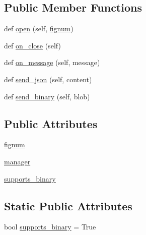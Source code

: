 \subsection*{Public Member Functions}
\begin{DoxyCompactItemize}
\item 
def \hyperlink{classmatplotlib_1_1backends_1_1backend__webagg_1_1WebAggApplication_1_1WebSocket_a1dfdc349a1da9bb45b24d4277d94e038}{open} (self, \hyperlink{classmatplotlib_1_1backends_1_1backend__webagg_1_1WebAggApplication_1_1WebSocket_a50abcf7b7843baae4b50170672a37886}{fignum})
\item 
def \hyperlink{classmatplotlib_1_1backends_1_1backend__webagg_1_1WebAggApplication_1_1WebSocket_aba3f0644181bbbdf2933b309eb1dd271}{on\+\_\+close} (self)
\item 
def \hyperlink{classmatplotlib_1_1backends_1_1backend__webagg_1_1WebAggApplication_1_1WebSocket_ab9a8cc1c5033e531ac3b9ab7cff82c19}{on\+\_\+message} (self, message)
\item 
def \hyperlink{classmatplotlib_1_1backends_1_1backend__webagg_1_1WebAggApplication_1_1WebSocket_ab5d2a19217336ecbdd695b0b681cd395}{send\+\_\+json} (self, content)
\item 
def \hyperlink{classmatplotlib_1_1backends_1_1backend__webagg_1_1WebAggApplication_1_1WebSocket_ace72d425cee9da5be3d4bb9530726caf}{send\+\_\+binary} (self, blob)
\end{DoxyCompactItemize}
\subsection*{Public Attributes}
\begin{DoxyCompactItemize}
\item 
\hyperlink{classmatplotlib_1_1backends_1_1backend__webagg_1_1WebAggApplication_1_1WebSocket_a50abcf7b7843baae4b50170672a37886}{fignum}
\item 
\hyperlink{classmatplotlib_1_1backends_1_1backend__webagg_1_1WebAggApplication_1_1WebSocket_a06e35560433ebb96795125337011235c}{manager}
\item 
\hyperlink{classmatplotlib_1_1backends_1_1backend__webagg_1_1WebAggApplication_1_1WebSocket_a7758d7f63c7960c12df089a5772167fc}{supports\+\_\+binary}
\end{DoxyCompactItemize}
\subsection*{Static Public Attributes}
\begin{DoxyCompactItemize}
\item 
bool \hyperlink{classmatplotlib_1_1backends_1_1backend__webagg_1_1WebAggApplication_1_1WebSocket_af2bc2bd1d099542c9fd9496bbcd09db0}{supports\+\_\+binary} = True
\end{DoxyCompactItemize}


